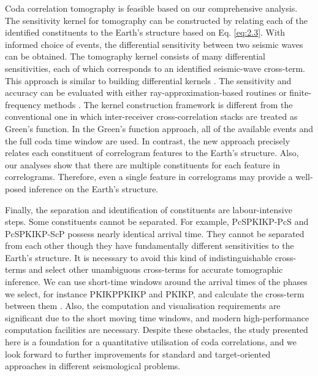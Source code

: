 Coda correlation tomography is feasible based on our comprehensive analysis. The sensitivity kernel for tomography can be constructed by relating each of the identified constituents to the Earth's structure based on Eq. \ref{eq:2.3}. With informed choice of events, the differential sensitivity between two seismic waves can be obtained. The tomography kernel consists of many differential sensitivities, each of which corresponds to an identified seismic-wave cross-term. This approach is similar to building differential kernels  \citep[e.g.,][]{calvet_traveltime_2005,ruigrok_scanning_2012}. The sensitivity and accuracy can be evaluated with either ray-approximation-based routines \citep[e.g.,][]{cerveny_seismic_2005} or finite-frequency methods \citep[e.g.,][]{marquering_three-dimensional_1999,dahlen_frechet_2000,hung_frechet_2000}. The kernel construction framework is different from the conventional one in which inter-receiver cross-correlation stacks are treated as Green's function. In the Green's function approach, all of the available events and the full coda time window are used. In contrast, the new approach precisely relates each constituent of correlogram features to the Earth's structure. Also, our analyses show that there are multiple constituents for each feature in correlograms. Therefore, even a single feature in correlograms may provide a well-posed inference on the Earth's structure.

Finally, the separation and identification of constituents are labour-intensive steps. Some constituents cannot be separated. For example, PcSPKIKP-PcS and PcSPKIKP-ScP possess nearly identical arrival time. They cannot be separated from each other though they have fundamentally different sensitivities to the Earth's structure. It is necessary to avoid this kind of indistinguishable cross-terms and select other unambiguous cross-terms for accurate tomographic inference. We can use short-time windows around the arrival times of the phases we select, for instance PKIKPPKIKP and PKIKP, and calculate the cross-term between them \citep[][Chapter \ref{ch:tomo}]{wang2020seismictomo}. Also, the computation and visualisation requirements are significant due to the short moving time windows, and modern high-performance computation facilities are necessary. Despite these obstacles, the study presented here is a foundation for a quantitative utilisation of coda correlations, and we look forward to further improvements for standard and target-oriented approaches in different seismological problems.


